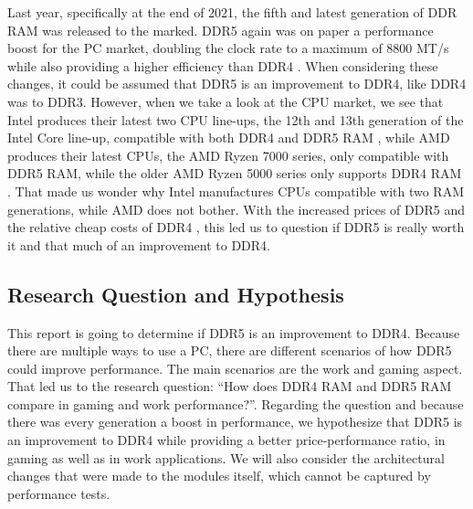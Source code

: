 Last year, specifically at the end of 2021, the fifth and latest generation of DDR RAM was released to the marked. DDR5 again was on paper a performance boost for the PC market, doubling the clock rate to a maximum of 8800 MT/s while also providing a higher efficiency than DDR4 \parencite{ddr5_overview_kingston}. When considering these changes, it could be assumed that DDR5 is an improvement to DDR4, like DDR4 was to DDR3. However, when we take a look at the CPU market, we see that Intel produces their latest two CPU line-ups, the 12th and 13th generation of the Intel Core line-up, compatible with both DDR4 and DDR5 RAM \parencite{Intel_13_presentation, Intel_12_RAM_specs}, while AMD produces their latest CPUs, the AMD Ryzen 7000 series, only compatible with DDR5 RAM, while the older AMD Ryzen 5000 series only supports DDR4 RAM \parencite{Ryzen_5000_RAM_specs, Ryzen_7000_RAM_specs}. That made us wonder why Intel manufactures CPUs compatible with two RAM generations, while AMD does not bother. With the increased prices of DDR5 and the relative cheap costs of DDR4 \parencite{Geizhals_ddr4, Geizhals_ddr5}, this led us to question if DDR5 is really worth it and that much of an improvement to DDR4.

\subsection{Research Question and Hypothesis}

This report is going to determine if DDR5 is an improvement to DDR4. Because there are multiple ways to use a PC, there are different scenarios of how DDR5 could improve performance. The main scenarios are the work and gaming aspect. That led us to the research question: “How does DDR4 RAM and DDR5 RAM compare in gaming and work performance?”. Regarding the question and because there was every generation a boost in performance, we hypothesize that DDR5 is an improvement to DDR4 while providing a better price-performance ratio, in gaming as well as in work applications. We will also consider the architectural changes that were made to the modules itself, which cannot be captured by performance tests.